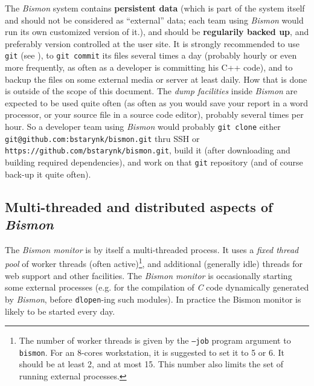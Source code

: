 The \textit{Bismon} system contains \textbf{persistent data} (which is
part of the system itself and should not be considered as ``external''
data; each team using \textit{Bismon} would run its own customized
version of it.), and should be \textbf{regularily backed up}, and
preferably version controlled at the user site. It is strongly
recommended to use \texttt{git} (see ), to
\texttt{git commit} its files several times a day (probably hourly or
even more frequently, as often as a developer is committing his C++
code), and to backup the files on some external media or server at
least daily. How that is done is outside of the scope of this
document. The \emph{dump facilities} inside \textit{Bismon} are
expected to be used quite often (as often as you would save your
report in a word processor, or your source file in a source code
editor), probably several times per hour. So a developer team using
\textit{Bismon} would probably \texttt{git clone} either
\texttt{git@github.com:bstarynk/bismon.git} thru SSH or
\texttt{https://github.com/bstarynk/bismon.git}, build it (after
downloading and building required dependencies), and work on that
\texttt{git} repository (and of course back-up it quite often).


\subsection{Multi-threaded and distributed aspects of \textit{Bismon}}

The \textit{Bismon monitor} is by itself a multi-threaded process. It
uses a \emph{fixed thread pool} of worker threads (often
active)\footnote{The number of worker threads is given by the
  \texttt{--job} program argument to \texttt{bismon}. For an 8-cores
  workstation, it is suggested to set it to 5 or 6. It should be at
  least 2, and at most 15. This number also limits the set of running
  external processes.}, and additional (generally idle) threads for
web support and other facilities. The \textit{Bismon monitor} is
occasionally starting some external processes (e.g. for the
compilation of \emph{C} code dynamically generated by \textit{Bismon},
before \texttt{dlopen}-ing such modules). In practice the Bismon
monitor is likely to be started every day.
